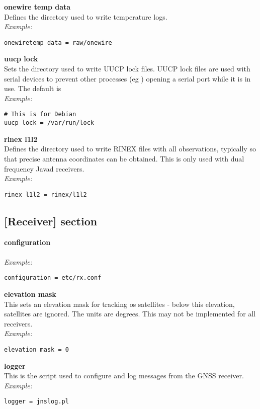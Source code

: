 {\bfseries onewire temp data}\\
Defines the directory used to write temperature logs.\\
\textit{Example:}
\begin{lstlisting}
onewiretemp data = raw/onewire
\end{lstlisting}

{\bfseries uucp lock}\\
Sets the directory used to write UUCP lock files. UUCP lock files are used with serial devices to prevent
other processes (eg ) opening a serial port while it is in use. The default is \\
\textit{Example:}
\begin{lstlisting}
# This is for Debian
uucp lock = /var/run/lock
\end{lstlisting}

{\bfseries rinex l1l2}\\ \hypertarget{h:rinex_l1l2}{}
Defines the directory used to write RINEX files with all observations, typically so that precise antenna coordinates
can be obtained. This is only used with dual frequency Javad receivers.\\
\textit{Example:}
\begin{lstlisting}
rinex l1l2 = rinex/l1l2
\end{lstlisting}


\subsection{[Receiver] section \label{sgcreceiver}}

\hypertarget{h:receiver}{}

{\bfseries configuration}\\
\\
\textit{Example:}
\begin{lstlisting}
configuration = etc/rx.conf
\end{lstlisting}

{\bfseries elevation mask}\\
This sets an elevation mask for tracking os satellites - below this elevation, satellites
are ignored. The units are degrees. This may not be implemented for all receivers.\\
\textit{Example:}
\begin{lstlisting}
elevation mask = 0
\end{lstlisting}

{\bfseries logger}\\
This is the script used to configure and log messages from the GNSS receiver.\\
\textit{Example:}
\begin{lstlisting}
logger = jnslog.pl
\end{lstlisting}

